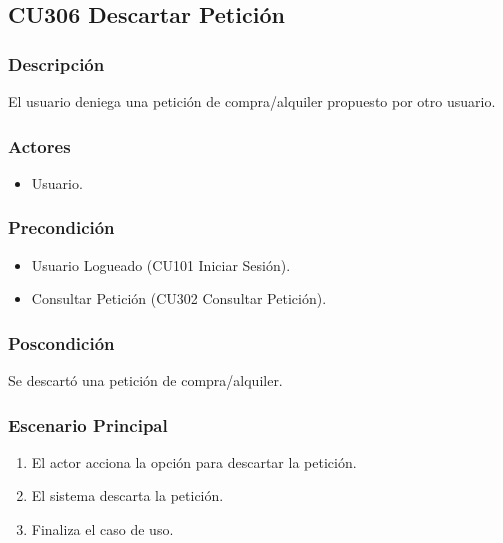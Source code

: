 \subsection{CU306 Descartar Petici\'{o}n}
\subsubsection{Descripci\'{o}n}
El usuario deniega una petici\'{o}n de compra/alquiler propuesto por otro usuario.
\subsubsection{Actores}
\begin{itemize}
\item Usuario.
\end{itemize}
\subsubsection{Precondici\'{o}n}
\begin{itemize}
\item Usuario Logueado (CU101 Iniciar Sesi\'{o}n).
\item Consultar Petici\'{o}n (CU302 Consultar Petici\'{o}n).
\end{itemize}
\subsubsection{Poscondici\'{o}n}
Se descart\'{o} una petici\'{o}n de compra/alquiler.
\subsubsection{Escenario Principal}
\begin{enumerate}
\item El actor acciona la opci\'{o}n para descartar la petici\'{o}n.
\item El sistema descarta la petici\'{o}n.
\item Finaliza el caso de uso.
\end{enumerate}
